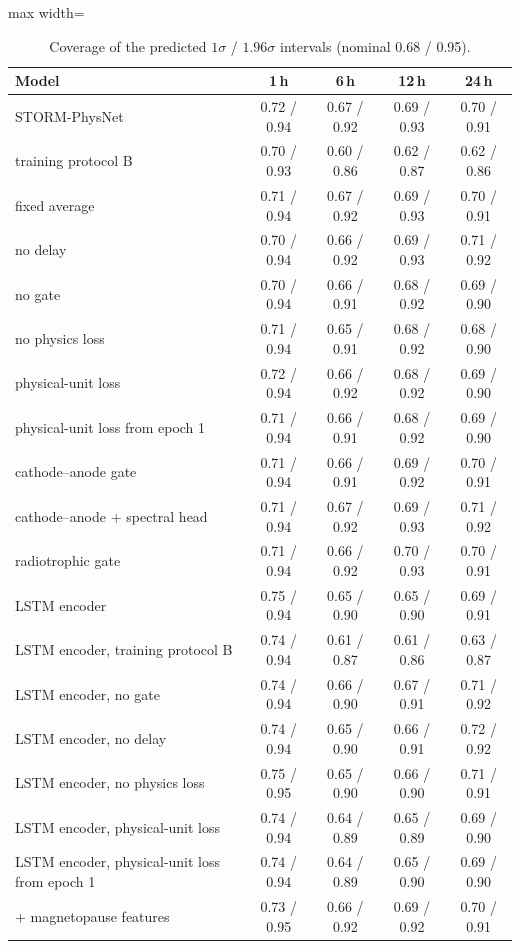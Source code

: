 \begin{table}[!t]
\centering
\caption{Coverage of the predicted $1\sigma$ / $1.96\sigma$ intervals (nominal 0.68 / 0.95).}
\label{tab:calib}
\footnotesize
\setlength{\tabcolsep}{4pt}
\begin{adjustbox}{max width=\linewidth}
\begin{tabular}{lcccc}
\toprule
Model & 1\,h & 6\,h & 12\,h & 24\,h \\
\midrule
STORM-PhysNet & 0.72 / 0.94 & 0.67 / 0.92 & 0.69 / 0.93 & 0.70 / 0.91 \\
\quad training protocol B & 0.70 / 0.93 & 0.60 / 0.86 & 0.62 / 0.87 & 0.62 / 0.86 \\
\quad fixed average & 0.71 / 0.94 & 0.67 / 0.92 & 0.69 / 0.93 & 0.70 / 0.91 \\
\quad no delay & 0.70 / 0.94 & 0.66 / 0.92 & 0.69 / 0.93 & 0.71 / 0.92 \\
\quad no gate & 0.70 / 0.94 & 0.66 / 0.91 & 0.68 / 0.92 & 0.69 / 0.90 \\
\quad no physics loss & 0.71 / 0.94 & 0.65 / 0.91 & 0.68 / 0.92 & 0.68 / 0.90 \\
\quad physical-unit loss & 0.72 / 0.94 & 0.66 / 0.92 & 0.68 / 0.92 & 0.69 / 0.90 \\
\quad physical-unit loss from epoch 1 & 0.71 / 0.94 & 0.66 / 0.91 & 0.68 / 0.92 & 0.69 / 0.90 \\
\quad cathode--anode gate & 0.71 / 0.94 & 0.66 / 0.91 & 0.69 / 0.92 & 0.70 / 0.91 \\
\quad cathode--anode + spectral head & 0.71 / 0.94 & 0.67 / 0.92 & 0.69 / 0.93 & 0.71 / 0.92 \\
\quad radiotrophic gate & 0.71 / 0.94 & 0.66 / 0.92 & 0.70 / 0.93 & 0.70 / 0.91 \\
\quad LSTM encoder & 0.75 / 0.94 & 0.65 / 0.90 & 0.65 / 0.90 & 0.69 / 0.91 \\
\quad LSTM encoder, training protocol B & 0.74 / 0.94 & 0.61 / 0.87 & 0.61 / 0.86 & 0.63 / 0.87 \\
\quad LSTM encoder, no gate & 0.74 / 0.94 & 0.66 / 0.90 & 0.67 / 0.91 & 0.71 / 0.92 \\
\quad LSTM encoder, no delay & 0.74 / 0.94 & 0.65 / 0.90 & 0.66 / 0.91 & 0.72 / 0.92 \\
\quad LSTM encoder, no physics loss & 0.75 / 0.95 & 0.65 / 0.90 & 0.66 / 0.90 & 0.71 / 0.91 \\
\quad LSTM encoder, physical-unit loss & 0.74 / 0.94 & 0.64 / 0.89 & 0.65 / 0.89 & 0.69 / 0.90 \\
\quad LSTM encoder, physical-unit loss from epoch 1 & 0.74 / 0.94 & 0.64 / 0.89 & 0.65 / 0.90 & 0.69 / 0.90 \\
\quad + magnetopause features & 0.73 / 0.95 & 0.66 / 0.92 & 0.69 / 0.92 & 0.70 / 0.91 \\
\bottomrule
\end{tabular}
\end{adjustbox}

\par\vspace{0.5ex}{\footnotesize\raggedright Fraction of test targets inside $\hat y\pm\hat\sigma$ and $\hat y\pm1.96\hat\sigma$, averaged over seeds and blocks.\par}
\end{table}
